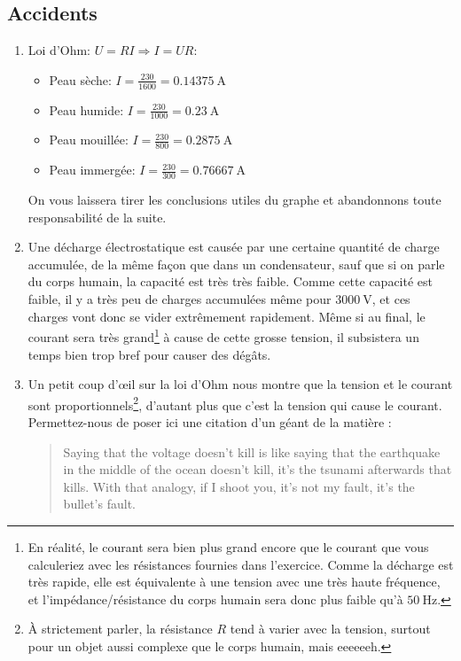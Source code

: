 \documentclass{article}
\begin{document}
\subsection{Accidents}
\begin{enumerate}
    \item Loi d'Ohm: $U=RI\Rightarrow I={U}{R}$:
    \begin{itemize}
        \item Peau sèche: $I=\frac{230}{1600}=\SI{0.14375}{\ampere}$
        \item Peau humide: $I=\frac{230}{1000}=\SI{0.23}{\ampere}$
        \item Peau mouillée: $I=\frac{230}{800}=\SI{0.2875}{\ampere}$
        \item Peau immergée: $I=\frac{230}{300}=\SI{0.76667}{\ampere}$
    \end{itemize}
    On vous laissera tirer les conclusions utiles du graphe et abandonnons toute responsabilité de la suite.
    \item Une décharge électrostatique est causée par une certaine quantité de charge accumulée, de la même façon que dans un condensateur, sauf que si on parle du corps humain, la capacité est très très faible. Comme cette capacité est faible, il y a très peu de charges accumulées même pour $\SI{3000}{\volt}$, et ces charges vont donc se vider extrêmement rapidement. Même si au final, le courant sera très grand\footnote{En réalité, le courant sera bien plus grand encore que le courant que vous calculeriez avec les résistances fournies dans l'exercice. Comme la décharge est très rapide, elle est équivalente à une tension avec une très haute fréquence, et l'impédance/résistance du corps humain sera donc plus faible qu'à $\SI{50}{\hertz}$.} à cause de cette grosse tension, il subsistera un temps bien trop bref pour causer des dégâts.
    \item Un petit coup d'\oe{}il sur la loi d'Ohm nous montre que la tension et le courant sont proportionnels\footnote{À strictement parler, la résistance $R$ tend à varier avec la tension, surtout pour un objet aussi complexe que le corps humain, mais eeeeeeh.}, d'autant plus que c'est la tension qui cause le courant. Permettez-nous de poser ici une citation d'un géant de la matière :
    \begin{quote}
    Saying that the voltage doesn't kill is like saying that the earthquake in the middle of the ocean doesn't kill, it's the tsunami afterwards that kills. With that analogy, if I shoot you, it's not my fault, it's the bullet's fault.
    \par{}
    \end{quote}
    

\end{enumerate}
\end{document}
